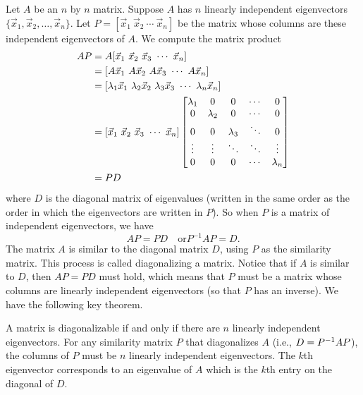 Let $A$ be an $n$ by $n$ matrix.  Suppose $A$ has $n$ linearly independent eigenvectors $\{\vec x_1,\vec x_2, \ldots, \vec x_n\}$. Let $P = [\vec x_1~\vec x_2~\cdots~\vec x_n]$ be the matrix whose columns are these independent eigenvectors of $A$.  We compute the matrix product
\begin{align*}
AP &= A[\vec x_1~\vec x_2~\vec x_3~\cdots~\vec x_n] \\
&= [A\vec x_1~A\vec x_2~A\vec x_3~\cdots~A\vec x_n] \\
&= [\lambda_1\vec x_1~\lambda_2\vec x_2~\lambda_3\vec x_3~\cdots~\lambda_n\vec x_n] \\
&= [\vec x_1~\vec x_2~\vec x_3~\cdots~\vec x_n]
\begin{bmatrix} 
\lambda_1&0&0&\cdots&0\\
0&\lambda_2&0&\cdots&0\\
0&0&\lambda_3&\ddots&0\\
\vdots&\vdots&\ddots&\ddots&\vdots\\
0&0&0&\cdots&\lambda_n\\ \end{bmatrix}\\
&= PD\end{align*} where $D$ is the diagonal matrix of eigenvalues (written in the same order as the order in which the eigenvectors are written in $P$).  
So when $P$ is a matrix of independent eigenvectors, we have $$AP = PD\quad \text{or}  P^{-1}AP=D.$$ The matrix $A$ is similar to the diagonal matrix $D$, using $P$ as the similarity matrix. 
This process is called diagonalizing a matrix. 
Notice that if $A$ is similar to $D$, then $AP=PD$ must hold, which means that $P$ must be a matrix whose columns are linearly independent eigenvectors (so that $P$ has an inverse). We have the following key theorem.
\begin{theorem}
A matrix is diagonalizable if and only if there are $n$ linearly independent eigenvectors. For any similarity matrix $P$ that diagonalizes $A$ (i.e., $D = P^{-1} A P$), the columns of $P$ must be $n$ linearly independent eigenvectors. The $k$th eigenvector corresponds to an eigenvalue of $A$ which is the $k$th entry on the diagonal of $D$. 
\end{theorem}

